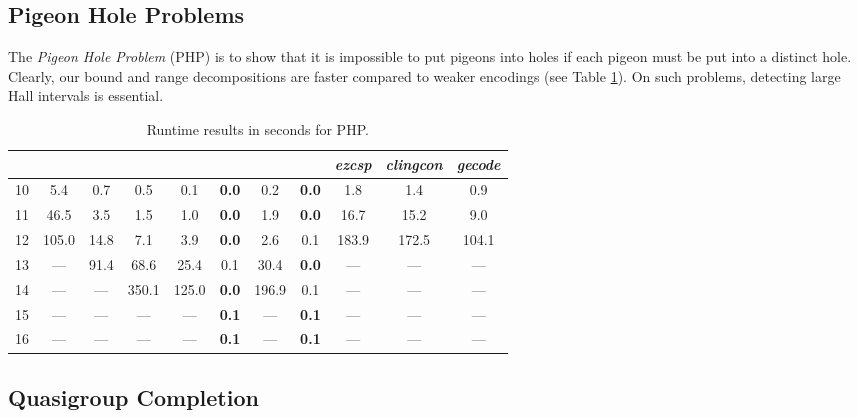\documentclass{tlp}
\newcommand{\systemname}[1]{\emph{#1}}
\newcommand{\encsup}{}
\newcommand{\encbou}{}
\newcommand{\encran}{}
\newcommand{\encbouh}[1]{\encbou}
\newcommand{\encranh}[1]{\encran}
\begin{document}
\subsection{Pigeon Hole Problems}

The \emph{Pigeon Hole Problem} (PHP) is to show that it is impossible to put  pigeons into  holes if each pigeon must be put into a distinct hole.
Clearly, our bound and range decompositions are faster compared to weaker encodings (see Table \ref{tab:php}). On such problems, detecting large Hall intervals is essential.
\begin{table}
\caption{Runtime results in seconds for PHP.}
\label{tab:php}
\begin{minipage}{\textwidth}
\begin{tabular}{ccccccccccc} \hline\hline
 & \encsup & \encbouh{1} & \encbouh{2} & \encbouh{3} & \encbou & \encranh{3} & \encran & \systemname{ezcsp} & \systemname{clingcon} & \systemname{gecode} \\ \hline
10 & 5.4 & 0.7 & 0.5 & 0.1 & \textbf{0.0} & 0.2 & \textbf{0.0} & 1.8 & 1.4 & 0.9 \\
11 & 46.5 & 3.5 & 1.5 & 1.0 & \textbf{0.0} & 1.9 & \textbf{0.0} & 16.7 & 15.2 & 9.0 \\
12 & 105.0 & 14.8 & 7.1 & 3.9 & \textbf{0.0} & 2.6 & 0.1 & 183.9 & 172.5 & 104.1 \\
13 & --- & 91.4 & 68.6 & 25.4 & 0.1 & 30.4 & \textbf{0.0} & --- & --- & --- \\
14 & --- & --- & 350.1 & 125.0 & \textbf{0.0} & 196.9 & 0.1 & --- & --- & --- \\
15 & --- & --- & --- & --- & \textbf{0.1} & --- & \textbf{0.1} & --- & --- & --- \\
16 & --- & --- & --- & --- & \textbf{0.1} & --- & \textbf{0.1} & --- & --- & --- \\ \hline\hline
\end{tabular}
\vspace{-2\baselineskip}
\end{minipage}
\end{table}


\subsection{Quasigroup Completion}
\end{document}
